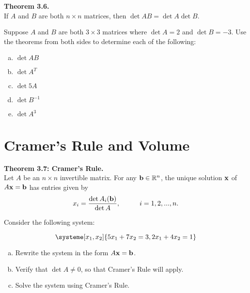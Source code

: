 \begin{boxthm}
	\textbf{Theorem 3.6.} \\
	If $A$ and $B$ are both $n \times n$ matrices, then $\det AB = \det A \det B$.
\end{boxthm}

\begin{exercise}
Suppose $A$ and $B$ are both $3 \times 3$ matrices where $\det A = 2$ and $\det B = -3$. Use the theorems from both sides to determine each of the following:

\begin{enumerate}[(a)]

\item $\det AB$

\vfill

\item $\det A^T$

\vfill

\item $\det 5A$

\vfill

\item $\det B^{-1}$

\vfill

\item $\det A^3$

\vfill

\end{enumerate}

\end{exercise}

\newpage

\section{Cramer's Rule and Volume}
\name

\begin{boxthm}
	\textbf{Theorem 3.7: Cramer's Rule.} \\
	Let $A$ be an $n \times n$ invertible matrix. For any $\boldsymbol{\mathbf{b}} \in \mathbb{R}^n$, the unique solution $\boldsymbol{\mathbf{x}}$ of $A\boldsymbol{\mathbf{x}}=\boldsymbol{\mathbf{b}}$ has entries given by $$x_i = \frac{\det A_i(\boldsymbol{\mathbf{b}})}{\det A}, \hspace{1cm} i = 1,2,...,n.$$
\end{boxthm}

\begin{exercise}
Consider the following system:

\[\systeme[x_1,x_2]{
	 5x_1	+	7x_2	= 3,
	2x_1	+	4x_2	= 1
	}
\]

\begin{enumerate}[(a)]

\item Rewrite the system in the form $A\boldsymbol{\mathbf{x}}=\boldsymbol{\mathbf{b}}$.
\vfill

\item Verify that $\det A \ne 0$, so that Cramer's Rule will apply.
\vfill

\item Solve the system using Cramer's Rule.
\vfill
\vfill
\vfill

\end{enumerate}
\end{exercise}

